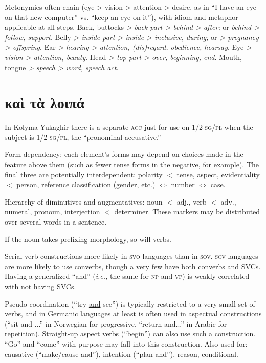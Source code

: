 \documentclass[11pt]{article}
\newcommand{\I}[1]{\textsc{#1}}   %
\begin{document}
Metonymies often chain (eye > vision > attention > desire, as in ``I
have an eye on that new computer'' vs. ``keep an eye on it''), with
idiom and metaphor applicable at all steps.  Back, buttocks \textit{>
back part > behind > after;} or \textit{behind > follow, support}.
Belly \textit{> inside part > inside > inclusive, during;} or
\textit{> pregnancy > offspring}.  Ear \textit{> hearing > attention,
(dis)regard, obedience, hearsay}.  Eye \textit{> vision > attention,
beauty}.  Head \textit{> top part > over, beginning, end}.  Mouth,
tongue \textit{> speech > word, speech act}.




\section{καὶ τὰ λοιπά}
In Kolyma Yukaghir there is a separate \I{acc} just for use on \I{1/2
sg/pl} when the subject is \I{1/2 sg/pl}, the ``pronominal
accusative.'' 

Form dependency: each element's forms may depend on choices made in
the feature above them (such as fewer tense forms in the negative, for
example).  The final three are potentially interdependent: polarity
$<$ tense, aspect, evidentiality $<$ person, reference classification
(gender, etc.) $\Leftrightarrow$ number $\Leftrightarrow$ case.

Hierarchy of diminutives and augmentatives: noun $<$ adj., verb $<$
adv., numeral, pronoun, interjection $<$ determiner.  These markers
may be distributed over several words in a sentence.

If the noun takes prefixing morphology, so will verbs.

Serial verb constructions more likely in \I{svo} languages than in
\I{sov}.  \I{sov} languages are more likely to use converbs, though a
very few have both converbs and SVCs.  Having a generalized ``and''
(\textit{i.e.,} the same for \I{np} and \I{vp}) is weakly correlated
with not having SVCs.

Pseudo-coordination (``try \uline{and} see'') is typically restricted
to a very small set of verbs, and in Germanic languages at least is
often used in aspectual constructions (``sit and ...'' in Norwegian
for progressive, ``return and...'' in Arabic for repetition).
Straight-up aspect verbs (``begin'') can also use such a
construction. ``Go'' and ``come'' with purpose may fall into this
construction.  Also used for: causative (``make/cause and''),
intention (``plan and''), reason, conditional.
\end{document}
